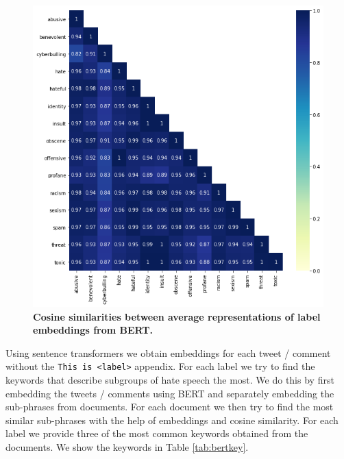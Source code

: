 \documentclass[fleqn,moreauthors,10pt]{ds_report}
\begin{document}
\begin{figure}[htb]\centering
	\includegraphics[width=\linewidth]{bert_sim1.png}
	\caption{\textbf{Cosine similarities between average representations of label embeddings from BERT.} }
	\label{fig:bertsim1}
\end{figure}


Using sentence transformers \cite{reimers-2019-sentence-bert} we obtain embeddings for each tweet / comment without the \texttt{This is <label>} appendix. For each label we try to find the keywords that describe subgroups of hate speech the most. We do this by first embedding the tweets / comments using BERT and separately embedding the sub-phrases from documents. For each document we then try to find the most similar sub-phrases with the help of embeddings and cosine similarity. For each label we provide three of the most common keywords obtained from the documents. We show the keywords in Table \ref{tab:bertkey}.
\end{document}
